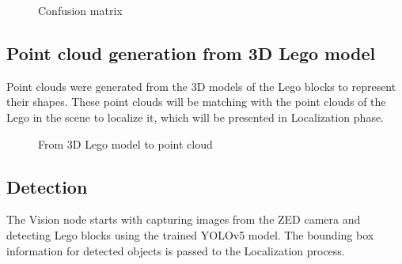 \documentclass{article}
\begin{document}
	\begin{figure}[H]
		\centering
		\caption{Confusion matrix}
		\label{fig:confusion_matrix}
	\end{figure}
	
	\subsection{Point cloud generation from 3D Lego model}
	Point clouds were generated from the 3D models of the Lego blocks to represent their shapes. These point clouds will be matching with the point clouds of the Lego in the scene to localize it, which will be presented in Localization phase.
	
	\begin{figure}[H]
		\centering
		\caption{From 3D Lego model to point cloud}
		\label{fig:pointcloud-from-3d}
	\end{figure}
	
	\subsection{Detection}
	The Vision node starts with capturing images from the ZED camera and detecting Lego blocks using the trained YOLOv5 model. The bounding box information for detected objects is passed to the Localization process.
	
\end{document}
